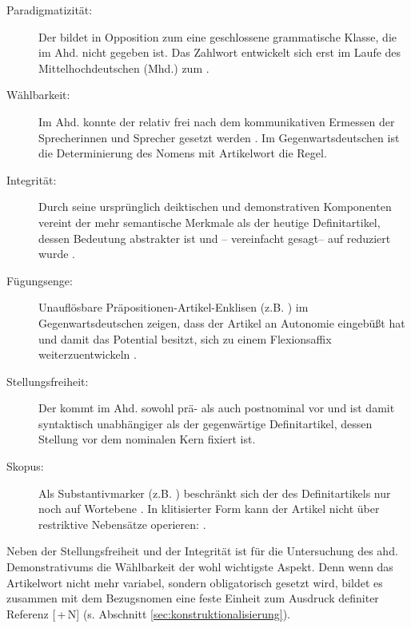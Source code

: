 \begin{description}
\item[Paradigmatizität:] Der  bildet in Opposition zum  eine geschlossene grammatische Klasse, die im Ahd. nicht gegeben ist. Das Zahlwort  entwickelt sich erst im Laufe des Mittelhochdeutschen (Mhd.) zum  \parencite{Szczepaniak2016}. 
\item[Wählbarkeit:] Im Ahd. konnte der  relativ frei nach dem kommunikativen Ermessen der Sprecherinnen und Sprecher gesetzt werden \parencite{Oubouzar1992}. Im Gegenwartsdeutschen ist die Determinierung des Nomens mit Artikelwort die Regel. 
\item[Integrität:] Durch seine ursprünglich deiktischen und demonstrativen Komponenten vereint der  mehr semantische Merkmale als der heutige Definitartikel, dessen Bedeutung abstrakter ist und -- vereinfacht gesagt-- auf  reduziert wurde \parencite[41]{Lehmann2015}.
\item[Fügungsenge:] Unauflösbare Präpositionen-Artikel-Enklisen (z.B. )  im Gegenwartsdeutschen zeigen, dass der Artikel an Autonomie eingebüßt hat und damit das Potential besitzt, sich zu einem Flexionsaffix  weiterzuentwickeln \parencite[s. hierzu][]{Nubling1992,Nubling2005}.  
\item[Stellungsfreiheit:] Der  kommt im Ahd. sowohl prä- als auch postnominal vor \parencite[27--28]{Schrodt2004} und ist damit syntaktisch unabhängiger als der gegenwärtige Definitartikel, dessen Stellung vor dem nominalen Kern fixiert ist. 
\item[Skopus:] Als Substantivmarker (z.B. ) beschränkt sich der  des Definitartikels nur noch auf Wortebene \parencite[71]{Szczepaniak2011a}. In klitisierter Form  kann der Artikel nicht über restriktive Nebensätze operieren:  \parencite[112]{Nubling2005}.
\end{description}

\noindent
Neben der Stellungsfreiheit  und der Integrität ist für die Untersuchung des ahd. Demonstrativums  die Wählbarkeit der wohl wichtigste Aspekt. Denn wenn das Artikelwort nicht mehr variabel, sondern obligatorisch gesetzt wird, bildet es zusammen mit dem Bezugsnomen eine feste Einheit zum Ausdruck definiter Referenz  [\,+\,N] (s. Abschnitt \ref{sec:konstruktionalisierung}). 

